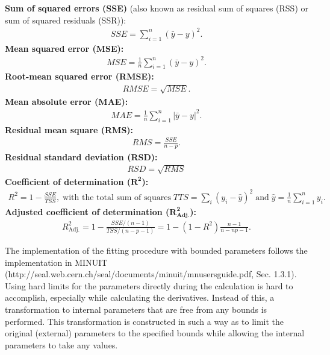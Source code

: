 \textbf{Sum of squared errors (SSE)} (also known as residual sum of squares (RSS) or sum of squared residuals (SSR)):
\begin{eqnarray*}
SSE = \sum_{i=1}^n (\bar y -y)^2.
\end{eqnarray*}
\textbf{Mean squared error (MSE):}
\begin{eqnarray*}
MSE = \frac{1}{n} \sum_{i=1}^n (\bar y -y)^2.
\end{eqnarray*}
\textbf{Root-mean squared error (RMSE):}
\begin{eqnarray*}
RMSE = \sqrt{MSE}.
\end{eqnarray*}
\textbf{Mean absolute error (MAE):}
\begin{eqnarray*}
MAE = \frac{1}{n} \sum_{i=1}^n |\bar y -y|^2.
\end{eqnarray*}
\textbf{Residual mean square (RMS):}
\begin{eqnarray*}
RMS = \frac{SSE}{n-p}.
\end{eqnarray*}
\textbf{Residual standard deviation (RSD):}
\begin{eqnarray*}
RSD = \sqrt{RMS}
\end{eqnarray*}
\textbf{Coefficient of determination ($\mathbf{R^2}$):}
\begin{eqnarray*}
R^2 = 1 - \frac{SSE}{TSS},\; \text{with the total sum of squares}\; TTS = \sum_i (y_i - \hat y)^2\; \text{and}\; \hat y = \frac 1n \sum_{i=1}^n y_i.
\end{eqnarray*}
\textbf{Adjusted coefficient of determination (}$\mathbf{R^2_{Adj.}}$\textbf{):}
\begin{eqnarray*}
R^2_{\mathrm{Adj.}} = 1 - \frac{SSE/(n-1)}{TSS/(n-p-1)} =  1 - (1-R^2) \frac{n-1}{n-np-1}.
\end{eqnarray*}


The implementation of the fitting procedure with bounded parameters follows the implementation in MINUIT (http://seal.web.cern.ch/seal/documents/minuit/mnusersguide.pdf, Sec. 1.3.1). Using hard limits for the parameters directly during the calculation is hard to accomplish, especially while calculating the derivatives. Instead of this, a transformation to internal parameters that are free from any bounds is performed. This transformation is constructed in such a way as to limit the original (external) parameters to the specified bounds while allowing the internal parameters to take any values.

